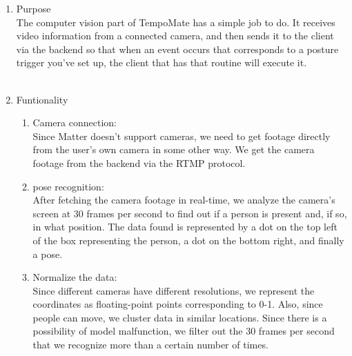                     \begin{enumerate}
                        \item Purpose\\
                              The computer vision part of TempoMate has a simple job to do.
                              It receives video information from a connected camera, and then sends it to the client via the backend so that when an event occurs that corresponds to a posture trigger you've set up, the client that has that routine will execute it.\\\\

                        \item Funtionality\\
                              \begin{enumerate}
                                  \item Camera connection:\\
                                        Since Matter doesn't support cameras, we need to get footage directly from the user's own camera in some other way. We get the camera footage from the backend via the RTMP protocol.\\

                                  \item pose recognition:\\
                                        After fetching the camera footage in real-time, we analyze the camera's screen at 30 frames per second to find out if a person is present and, if so, in what position. The data found is represented by a dot on the top left of the box representing the person, a dot on the bottom right, and finally a pose.\\

                                  \item Normalize the data:\\
                                        Since different cameras have different resolutions, we represent the coordinates as floating-point points corresponding to 0-1. Also, since people can move, we cluster data in similar locations. Since there is a possibility of model malfunction, we filter out the 30 frames per second that we recognize more than a certain number of times.\\


\end{enumerate}
\end{enumerate}
